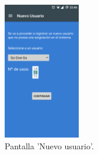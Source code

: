 \documentclass[../PFC.tex]{subfiles}
\begin{document}
\begin{figure}[H]
  \centering
  \includegraphics[width=0.3\textwidth]{./img/app/nuevoUsuario}
  \caption{Pantalla 'Nuevo usuario'.}
  \label{img:app:nuevoUsuario1}
\end{figure}  

\end{document}
